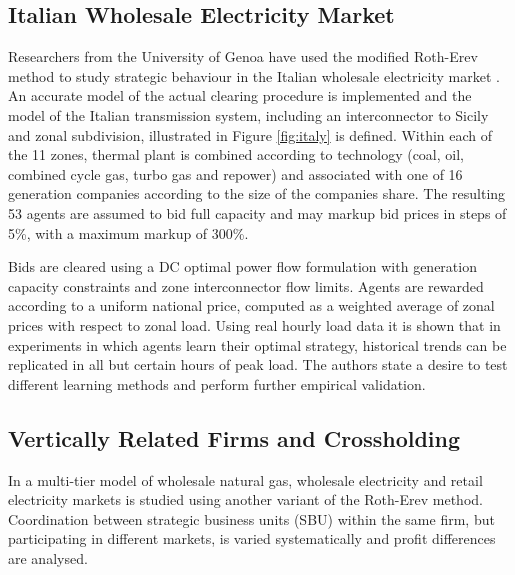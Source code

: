 \subsection{Italian Wholesale Electricity Market}

%

Researchers from the University of Genoa have used the modified Roth-Erev
method to study strategic behaviour in the Italian wholesale electricity market
\cite{cincotti:09}.  An accurate model of the actual clearing procedure is
implemented and the model of the Italian transmission system, including an
interconnector to Sicily and zonal subdivision, illustrated in Figure
\ref{fig:italy} is defined.  Within each of the 11 zones, thermal plant is
combined according to technology (coal, oil, combined cycle gas, turbo gas and
repower) and associated with one of 16 generation companies according to the
size of the companies share.  The resulting 53 agents are assumed to bid full
capacity and may markup bid prices in steps of 5\%, with a maximum markup of
300\%.


Bids are cleared using a DC optimal power flow formulation with
generation capacity constraints and zone interconnector flow limits.  Agents are
rewarded according to a uniform national price, computed as a weighted average
of zonal prices with respect to zonal load.  Using real hourly load data it
is shown that in experiments in which agents learn their optimal
strategy, historical trends can be replicated in all but certain hours of
peak load.  The authors state a desire to test different learning methods and perform
further empirical validation.

\subsection{Vertically Related Firms and Crossholding}
In  a multi-tier model of wholesale natural gas, wholesale
electricity and retail electricity markets is studied using another variant of
the Roth-Erev method.  Coordination between strategic business units (SBU)
within the same firm, but participating in different markets, is varied
systematically and profit differences are analysed.

